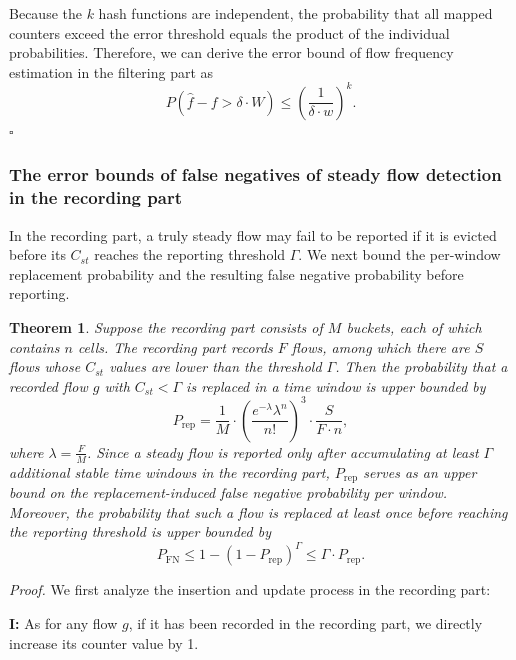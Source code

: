 \documentclass[preprint,12pt]{elsarticle}
\newtheorem{theorem}{Theorem}
\begin{document}
Because the $k$ hash functions are independent, the probability that all mapped counters exceed the error threshold equals the product of the individual probabilities. Therefore, we can derive the error bound of flow frequency estimation in the filtering part as
\begin{equation}
    P(\hat{f} - f > \delta \cdot W) \le \left(\frac{1}{\delta \cdot w}\right)^k.
\end{equation}
\hfill $\square$

\subsubsection{The error bounds of false negatives of steady flow detection in the recording part}

In the recording part, a truly steady flow may fail to be reported if it is evicted before its $C_{st}$ reaches the reporting threshold $\Gamma$. We next bound the per-window replacement probability and the resulting false negative probability before reporting.

\begin{theorem}
Suppose the recording part consists of $M$ buckets, each of which contains $n$ cells. The recording part records $F$ flows, among which there are $S$ flows whose $C_{st}$ values are lower than the threshold $\Gamma$. Then the probability that a recorded flow $g$ with $C_{st} < \Gamma$ is replaced in a time window is upper bounded by
\begin{equation}
    P_{\mathrm{rep}} = \frac{1}{M} \cdot \left(\frac{e^{-\lambda} \lambda^n}{n!}\right)^3 \cdot \frac{S}{F \cdot n},
\end{equation}
where $\lambda = \frac{F}{M}$. Since a steady flow is reported only after accumulating at least $\Gamma$ additional stable time windows in the recording part, $P_{\mathrm{rep}}$ serves as an upper bound on the replacement-induced false negative probability per window. Moreover, the probability that such a flow is replaced at least once before reaching the reporting threshold is upper bounded by
\begin{equation}
    P_{\mathrm{FN}} \le 1 - (1 - P_{\mathrm{rep}})^{\Gamma} \le \Gamma \cdot P_{\mathrm{rep}}.
\end{equation}
\end{theorem}

\textit{Proof.} We first analyze the insertion and update process in the recording part:

\textbf{I:} As for any flow $g$, if it has been recorded in the recording part, we directly increase its counter value by 1.
\end{document}
